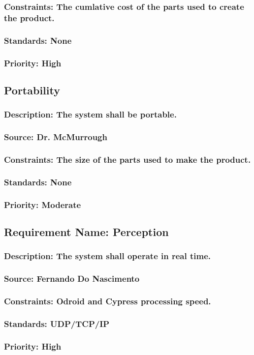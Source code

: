 \subsubsection{Constraints: The cumlative cost of the parts used to create the product.}
\subsubsection{Standards: None}
\subsubsection{Priority: High}

\subsection{Portability}
\subsubsection{Description: The system shall be portable.}
\subsubsection{Source: Dr. McMurrough}
\subsubsection{Constraints: The size of the parts used to make the product.}
\subsubsection{Standards: None}
\subsubsection{Priority: Moderate}

\subsection{Requirement Name: Perception}
\subsubsection{Description: The system shall operate in real time.}
\subsubsection{Source: Fernando Do Nascimento}
\subsubsection{Constraints: Odroid and Cypress processing speed.}
\subsubsection{Standards: UDP/TCP/IP}
\subsubsection{Priority: High}